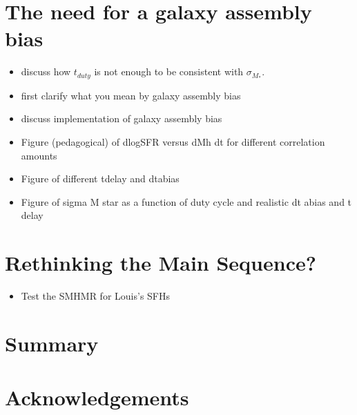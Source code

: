 \documentclass[12pt, letterpaper, preprint]{aastex}
\newcommand{\bitem}{\begin{itemize}}
\newcommand{\eitem}{\end{itemize}}
\begin{document}
\section{The need for a galaxy assembly bias}
\bitem
\item discuss how $t_{duty}$ is not enough to be consistent with $\sigma_{M_*}$. 
\item first clarify what you mean by galaxy assembly bias 
\item discuss implementation of galaxy assembly bias
\item Figure (pedagogical) of dlogSFR versus dMh dt for different correlation amounts 
\item Figure of different tdelay and dtabias 
\item Figure of sigma M star as a function of duty cycle and realistic dt abias and t delay 
\eitem

\section{Rethinking the Main Sequence?}
\bitem 
\item Test the SMHMR for Louis's SFHs 
\eitem 

\section{Summary} \label{sec:summary}

\section*{Acknowledgements}

%

\end{document}

